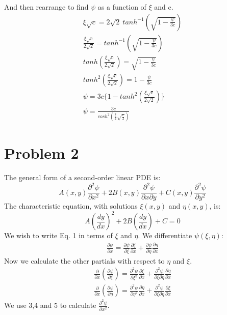 \documentclass[a4paper,10pt]{article}
\numberwithin{equation}{section}
\begin{document}
And then rearrange to find $\psi$ as a function of $\xi$ and c.
\begin{gather}
 \xi \sqrt{c}=2\sqrt{2}\ tanh^{-1}(\sqrt{1-\frac{\psi}{3c}} )\\
 \frac{\xi \sqrt{c}}{2\sqrt{2}}=tanh^{-1}(\sqrt{1-\frac{\psi}{3c}} )\\
 tanh(\frac{\xi \sqrt{c}}{2\sqrt{2}})=\sqrt{1-\frac{\psi}{3c}}\\
 tanh^{2}(\frac{\xi \sqrt{c}}{2\sqrt{2}})=1-\frac{\psi}{3c}\\
 \psi=3c\{1-tanh^{2}(\frac{\xi \sqrt{c}}{2\sqrt{2}})\}\\
 \psi=\frac{3c}{cosh^{2}(\frac{\xi}{2}\sqrt{\frac{c}{2}})}
\end{gather}

\section{Problem 2}
The general form of a second-order linear PDE is:
\begin{equation}
 A(x,y)\frac{\partial ^2 \psi}{\partial x^2}+2B(x,y)\frac{\partial ^2\psi}{\partial x \partial y}+C(x,y)\frac{\partial ^2 \psi}{\partial y^2}
\end{equation}
The characteristic equation,  with solutions $\xi(x,y)$ and $\eta(x,y)$, is:
\begin{equation}
 A(\frac{dy}{dx})^2+2B(\frac{dy}{dx})+C=0
\end{equation}
We wish to write Eq. 1 in terms of $\xi$ and $\eta$. We differentiate $\psi(\xi, \eta)$:
\begin{gather}
\frac{\partial \psi}{\partial x}=\frac{\partial \psi}{\partial \xi}\frac{\partial \xi}{\partial x}+\frac{\partial \psi}{\partial \eta}\frac{\partial \eta}{\partial x}
\end{gather}
Now we calculate the other partials with respect to $\eta$ and $\xi$.
\begin{gather}
\frac{\partial}{\partial x}(\frac{\partial \psi}{\partial \xi})=\frac{\partial ^2 \psi}{\partial \xi^2}\frac{\partial \xi}{\partial x}+
\frac{\partial ^2 \psi}{\partial \xi \partial \eta}\frac{\partial \eta}{\partial x}\\
\frac{\partial}{\partial x}(\frac{\partial \psi}{\partial \eta})=\frac{\partial ^2 \psi}{\partial \eta^2}\frac{\partial \eta}{\partial x}+
\frac{\partial ^2 \psi}{\partial \xi \partial \eta}\frac{\partial \xi}{\partial x}
\end{gather}
We use 3,4 and 5 to calculate $\frac{\partial ^2 \psi}{\partial x^2}$.
\end{document}
